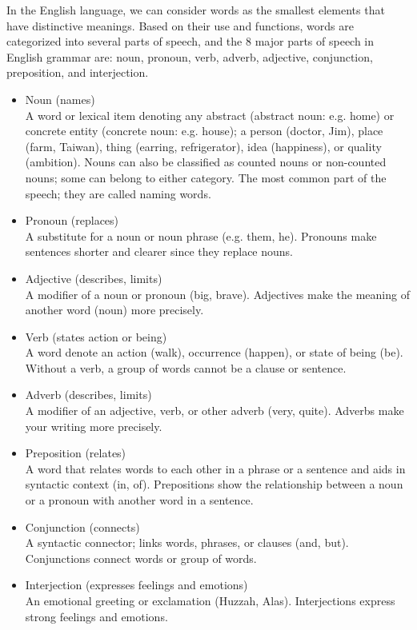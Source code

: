 In the English language, we can consider words as the smallest elements that have distinctive meanings.
Based on their use and functions, words are categorized into several parts of speech, and the 8 major parts of speech in English grammar are: noun, pronoun, verb, adverb, adjective, conjunction, preposition, and interjection.
\begin{itemize}
	\item Noun (names)\\
	A word or lexical item denoting any abstract (abstract noun: e.g. home) or concrete entity (concrete noun: e.g. house); a person (doctor, Jim), place (farm, Taiwan), thing (earring, refrigerator), idea (happiness), or quality (ambition). Nouns can also be classified as counted nouns or non-counted nouns; some can belong to either category. The most common part of the speech; they are called naming words.
	
	\item Pronoun (replaces)\\
	A substitute for a noun or noun phrase (e.g. them, he). Pronouns make sentences shorter and clearer since they replace nouns.
	
	\item Adjective (describes, limits)\\
	A modifier of a noun or pronoun (big, brave). Adjectives make the meaning of another word (noun) more precisely.
	
	\item Verb (states action or being)\\
	A word denote an action (walk), occurrence (happen), or state of being (be). Without a verb, a group of words cannot be a clause or sentence.
	\item Adverb (describes, limits)\\
	A modifier of an adjective, verb, or other adverb (very, quite). Adverbs make your writing more precisely.
	
	\item Preposition (relates)\\
	A word that relates words to each other in a phrase or a sentence and aids in syntactic context (in, of). Prepositions show the relationship between a noun or a pronoun with another word in a sentence.
	
	\item Conjunction (connects)\\
	A syntactic connector; links words, phrases, or clauses (and, but). Conjunctions connect words or group of words.
	
	\item Interjection (expresses feelings and emotions)\\
	An emotional greeting or exclamation (Huzzah, Alas). Interjections express strong feelings and emotions.
\end{itemize}

